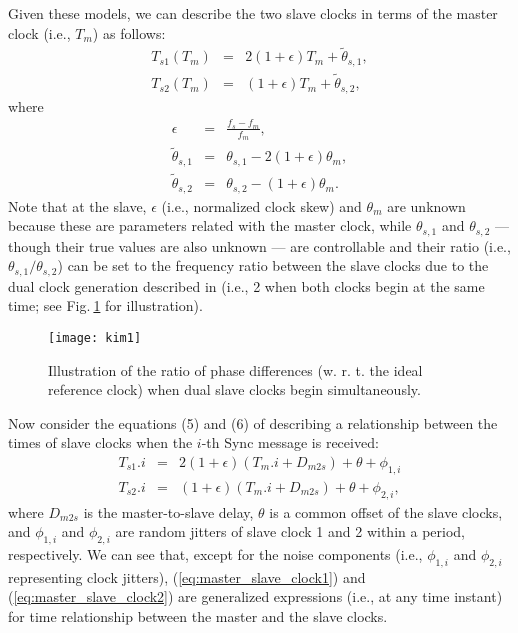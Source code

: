 \documentclass[journal,twoside,final]{IEEEtran}
\begin{document}
Given these models, we can describe the two slave clocks in terms of the master
clock (i.e., $T_{m}$) as follows:
\begingroup
\setlength{\arraycolsep}{0.0em}
\begin{eqnarray}
  T_{s1}(T_{m}) &{=}& 2\left(1 + \epsilon\right) T_{m} + \tilde{\theta}_{s,1}, \label{eq:master_slave_clock1} \\
  T_{s2}(T_{m}) &{=}& \left(1 + \epsilon\right) T_{m} + \tilde{\theta}_{s,2}, \label{eq:master_slave_clock2}
\end{eqnarray}
\endgroup
where
\begingroup
\setlength{\arraycolsep}{0.0em}
\begin{eqnarray}
  \epsilon &{=}& \frac{f_{s}-f_{m}}{f_{m}}, \label{eq:clock_skew} \\
  \tilde{\theta}_{s,1} &{=}& \theta_{s,1} - 2\left(1 + \epsilon\right)\theta_{m}, \label{eq:slave_clock1_phase} \\
  \tilde{\theta}_{s,2} &{=}& \theta_{s,2} - \left(1 + \epsilon\right)\theta_{m}. \label{eq:slave_clock2_phase}
\end{eqnarray}
\endgroup
Note that at the slave, $\epsilon$ (i.e., normalized clock skew) and
$\theta_{m}$ are unknown because these are parameters related with the master
clock, while $\theta_{s,1}$ and $\theta_{s,2}$ --- though their true values are
also unknown --- are controllable and their ratio (i.e.,
$\theta_{s,1}/\theta_{s,2}$) can be set to the frequency ratio between the slave
clocks due to the dual clock generation described in \cite{chin09:_ieee} (i.e.,
2 when both clocks begin at the same time; see Fig.\(~\)\ref{fg:phase_ratio}
for illustration).
\newlength{\figwidth} \setlength{\figwidth}{.65\linewidth}
\begin{figure}[!t]
  \begin{center}
    \texttt{[image: kim1]}
  \end{center}
  \caption{Illustration of the ratio of phase differences (w. r. t. the ideal
    reference clock) when dual slave clocks begin simultaneously.}
  \label{fg:phase_ratio}
\end{figure}

Now consider the equations (5) and (6) of \cite{chin09:_ieee} describing a
relationship between the times of slave clocks when the $i$-th Sync message is
received:
\begingroup
\setlength{\arraycolsep}{0.0em}
\begin{eqnarray}
  T_{s1}.i &{=}& 2 \left(1 + \epsilon\right) \left(T_{m}.i + D_{m2s}\right) + \theta + \phi_{1,i} \label{eq:slave_clock1} \nonumber \\
  T_{s2}.i &{=}& \left( 1 + \epsilon\right) \left(T_{m}.i + D_{m2s}\right) + \theta + \phi_{2,i}  \label{eq:slave_clock2} \nonumber ,
\end{eqnarray}
\endgroup
where $D_{m2s}$ is the master-to-slave delay, $\theta$ is a common offset of the
slave clocks, and $\phi_{1,i}$ and $\phi_{2,i}$ are random jitters of slave
clock 1 and 2 within a period, respectively. We can see that, except for the
noise components (i.e., $\phi_{1,i}$ and $\phi_{2,i}$ representing clock
jitters), (\ref{eq:master_slave_clock1}) and (\ref{eq:master_slave_clock2}) are
generalized expressions (i.e., at any time instant) for time relationship
between the master and the slave clocks.
\end{document}
